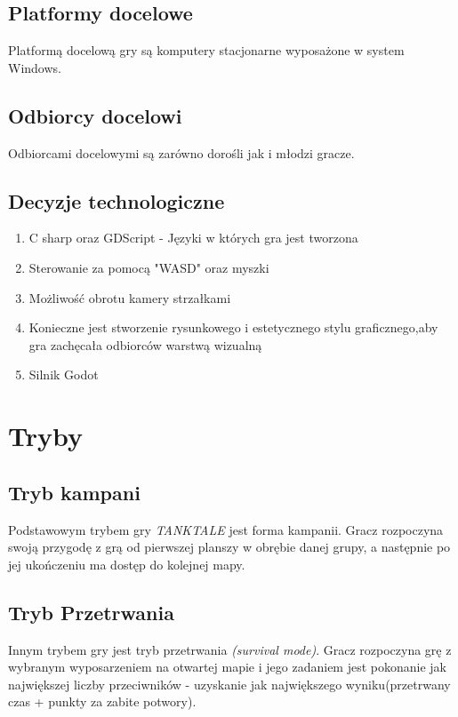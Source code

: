 \documentclass{article}
\begin{document}
    \subsection{Platformy docelowe}
    Platformą docelową gry są komputery stacjonarne wyposażone w system Windows.
    \subsection{Odbiorcy docelowi}
    Odbiorcami docelowymi są zarówno dorośli jak i młodzi gracze.
    \subsection{Decyzje technologiczne}
    \begin{enumerate}
       \item C sharp oraz GDScript - Języki w których gra jest tworzona
       
    \item Sterowanie za pomocą "WASD" oraz myszki
     \item Możliwość obrotu kamery strzałkami
     \item Konieczne  jest  stworzenie  rysunkowego  i  estetycznego  stylu  graficznego,aby gra zachęcała odbiorców warstwą wizualną \item Silnik Godot
\end{enumerate}



\section{Tryby}
    \subsection{Tryb kampani}
Podstawowym trybem gry \emph{TANKTALE} jest forma kampanii. Gracz rozpoczyna swoją przygodę z grą od pierwszej planszy w obrębie danej grupy, a następnie po jej ukończeniu ma dostęp do kolejnej mapy.
    \subsection{Tryb Przetrwania}
Innym trybem gry jest tryb przetrwania \emph{(survival mode)}. Gracz rozpoczyna grę z wybranym wyposarzeniem na otwartej mapie i jego zadaniem jest pokonanie jak największej liczby przeciwników - uzyskanie jak największego wyniku(przetrwany czas + punkty za zabite potwory).
    \newpage
    
\end{document}
